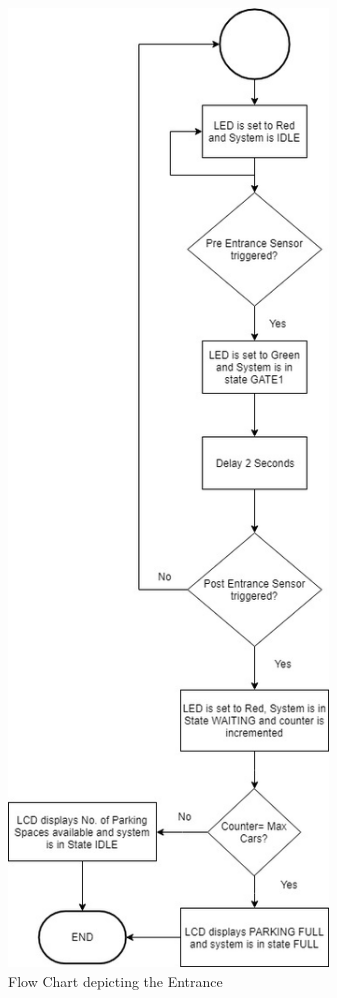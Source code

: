 \documentclass[11pt,a4paper,twocolumn]{article}
\begin{document}
\begin{figure}[b]
	\centering
	\includegraphics[width=85mm]{FlowChartEntrance}
	\caption{Flow Chart depicting the Entrance}
	\label{fig:entrance}
	\centering
\end{figure}
\end{document}
